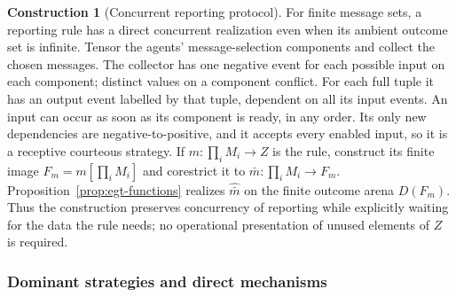 \documentclass[11pt,a4paper]{article}
\numberwithin{equation}{section}
\theoremstyle{definition}
\newtheorem{construction}[construction]{Construction}
\theoremstyle{remark}
\theoremstyle{plain}
\begin{document}
\begin{construction}[Concurrent reporting protocol]
For finite message sets, a reporting rule has a direct concurrent
realization even when its ambient outcome set is infinite. Tensor the
agents' message-selection components and collect the chosen messages. The
collector has one negative event for each possible input on each component;
distinct values on a component conflict. For each full tuple it has an
output event labelled by that tuple, dependent on all its input events. An
input can occur as soon as its component is ready, in any order. Its only
new dependencies are negative-to-positive, and it accepts every enabled
input, so it is a receptive courteous strategy. If
$m:\prod_iM_i\to Z$ is the rule, construct its finite image
$F_m=m[\prod_iM_i]$ and corestrict it to
$\bar m:\prod_iM_i\to F_m$. Proposition~\ref{prop:egt-functions} realizes
$\widehat{\bar m}$ on the finite outcome arena $D(F_m)$. Thus the
construction preserves concurrency of reporting while explicitly waiting
for the data the rule needs; no operational presentation of unused elements of
$Z$ is required.
\end{construction}

\subsubsection{Dominant strategies and direct mechanisms}
\end{document}
